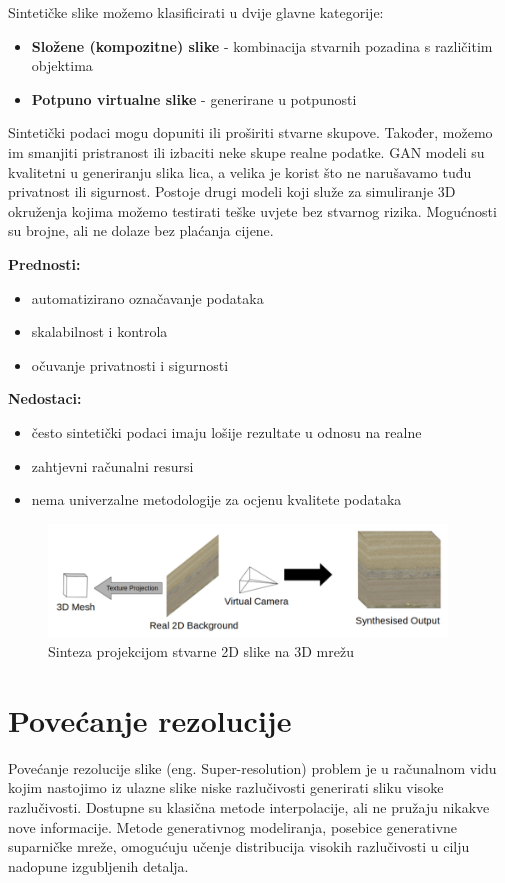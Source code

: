 \documentclass[times, utf8, seminar, numeric]{fer}
\begin{document}
		
		Sintetičke slike možemo klasificirati u dvije glavne kategorije:
		\begin{itemize}
			\item \textbf{Složene (kompozitne) slike} - kombinacija stvarnih pozadina s različitim objektima
			\item \textbf{Potpuno virtualne slike} - generirane u potpunosti
		\end{itemize}
		
		
		Sintetički podaci mogu dopuniti ili proširiti stvarne skupove. Također, možemo im smanjiti pristranost ili izbaciti neke skupe realne podatke. GAN modeli su kvalitetni u generiranju slika lica, a velika je korist što ne narušavamo tuđu privatnost ili sigurnost. Postoje drugi modeli koji služe za simuliranje 3D okruženja kojima možemo testirati teške uvjete bez stvarnog rizika. Mogućnosti su brojne, ali ne dolaze bez plaćanja cijene. \cite{jimaging8110310}
		
		\textbf{Prednosti: }
		\begin{itemize}
			\item automatizirano označavanje podataka
			\item skalabilnost i kontrola
			\item očuvanje privatnosti i sigurnosti
		\end{itemize}
		
			\textbf{Nedostaci: }
		\begin{itemize}
			\item često sintetički podaci imaju lošije rezultate u odnosu na realne 
			\item zahtjevni računalni resursi
			\item nema univerzalne metodologije za ocjenu kvalitete podataka
		\end{itemize}
		
		\begin{figure}[H]
			\centering
			\includegraphics[width=300pt]{images/apply/synthetic/synthetic_data.png}
			\caption{Sinteza projekcijom stvarne 2D slike na 3D mrežu \cite{jimaging8110310}}
			\label{fig:synthetic}
		\end{figure}
		
		\section{Povećanje rezolucije}
		Povećanje rezolucije slike (eng. Super-resolution) problem je u računalnom vidu kojim nastojimo iz ulazne slike niske razlučivosti generirati sliku visoke razlučivosti. Dostupne su klasična metode interpolacije, ali ne pružaju nikakve nove informacije. Metode generativnog modeliranja, posebice generativne suparničke mreže, omogućuju učenje distribucija visokih razlučivosti u cilju nadopune izgubljenih detalja. 
		
\end{document}
